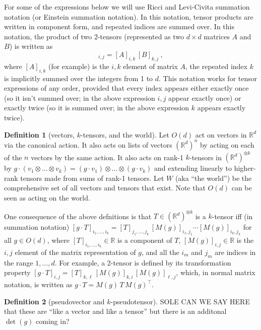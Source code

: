 \documentclass{article}
\theoremstyle{definition}
\newtheorem{definition}{Definition}
\begin{document}
For some of the expressions below we will use Ricci and Levi-Civita summation notation (or Einstein summation notation).
In this notation, tensor products are written in component form, and repeated indices are summed over.
In this notation, the product of two 2-tensors (represented as two $d\times d$ matrices $A$ and $B$) is written as
\begin{equation}
    [A\, B]_{i,j} = [A]_{i,k}\,[B]_{k,j} ~,
\end{equation}
where $[A]_{i,k}$ (for example) is the $i,k$ element of matrix $A$, the repeated index $k$ is implicitly summed over the integers from 1 to $d$.
This notation works for tensor expressions of any order, provided that every index appears either exactly once (so it isn't summed over; in the above expression $i, j$ appear exactly once) or exactly twice (so it is summed over; in the above expression $k$ appears exactly twice). 

\begin{definition}[vectors, $k$-tensors, and the world]
Let $O(d)$ act on vectors in $\mathbb R^d$ via the canonical action.
It also acts on lists of vectors $(\mathbb R^d)^n$ by acting on each of the $n$ vectors by the same action.
It also acts on rank-1 $k$-tensors in $(\mathbb R^d)^{\otimes k}$ by $g\cdot (v_{1}\otimes\ldots \otimes v_k) = (g\cdot v_1)\otimes \ldots \otimes (g\cdot v_k)$ and extending linearly to higher-rank tensors made from sums of rank-1 tensors.
Let $W$ (aka ``the world'') be the comprehensive set of all vectors and tensors that exist.
Note that $O(d)$ can be seen as acting on the world.
\end{definition}

One consequence of the above defnitions is that 
$T\in (\mathbb R^d)^{\otimes k}$ is a $k$-tensor iff (in summation notation)
$[g\cdot T]_{i_1,\ldots, i_k} = [T]_{j_1,\ldots,j_k}\,[M(g)]_{i_1,j_1}\cdots[M(g)]_{i_k,j_k}$ for all $g\in O(d)$, where $[T]_{i_1, \ldots ,i_k} \in \mathbb R$ is a component of $T$, $[M(g)]_{i,j}\in\mathbb R$ is the $i,j$ element of the matrix representation of $g$, and all the $i_m$ and $j_m$ are indices in the range $1,\ldots,d$.
For example, a 2-tensor is defined by its transformation property
$[g\cdot T]_{i,j} = [T]_{k,\ell}\,[M(g)]_{k,i}\,[M(g)]_{\ell,j}$,
which, in normal matrix notation, is written as
$g\cdot T = M(g)\,T\,M(g)^\top$.

\begin{definition}[pseudovector and $k$-pseudotensor]
SOLE CAN WE SAY HERE that these are ``like a vector and like a tensor'' but there is an additonal $\det(g)$ coming in?
\end{definition}
\end{document}
